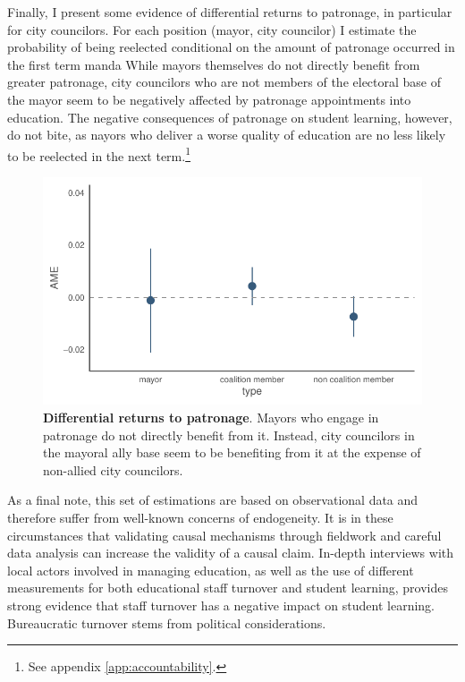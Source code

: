 \documentclass[12pt,a4paper]{article}
\begin{document}
Finally, I present some evidence of differential returns to patronage, in particular for city councilors. For each position (mayor, city councilor) I estimate the probability of being reelected conditional on the amount of patronage occurred in the first term manda While mayors themselves do not directly benefit from greater patronage, city councilors who are not members of the electoral base of the mayor seem to be negatively affected by patronage appointments into education. The negative consequences of patronage on student learning, however, do not bite, as nayors who deliver a worse quality of education are no less likely to be reelected in the next term.\footnote{See appendix \ref{app:accountability}.}

\begin{figure}[h]
    \centering
    \includegraphics[width=0.6\linewidth]{plots/reelection_marginal_effect_plots.pdf}
    \caption{\textbf{Differential returns to patronage}. Mayors who engage in patronage do not directly benefit from it. Instead, city councilors in the mayoral ally base seem to be benefiting from it at the expense of non-allied city councilors.}
\end{figure}

As a final note, this set of estimations are based on observational data and therefore suffer from well-known concerns of endogeneity. It is in these circumstances that validating causal mechanisms through fieldwork and careful data analysis can increase the validity of a causal claim. In-depth interviews with local actors involved in managing education, as well as the use of different measurements for both educational staff turnover and student learning, provides strong evidence that staff turnover has a negative impact on student learning. Bureaucratic turnover stems from political considerations.


\end{document}
